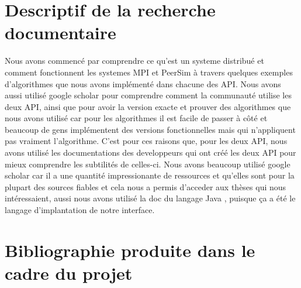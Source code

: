 \documentclass{article}
\begin{document}
		\section{Descriptif de la recherche documentaire}
		\indent Nous avons commencé par comprendre ce qu'est un systeme distribué et comment fonctionnent les systemes MPI et PeerSim à travers quelques exemples d'algorithmes que nous avons implémenté dans chacune des API. 
		\newline
		\indent	
Nous avons aussi utilisé google scholar pour comprendre comment la communauté utilise les deux API, ainsi que pour avoir la version exacte et prouver des algorithmes que nous avons utilisé car pour les algorithmes il est facile de passer à côté et beaucoup de gens implémentent des versions fonctionnelles mais qui n'appliquent pas vraiment l'algorithme.
		\newline
		\indent
 C'est pour ces raisons que, pour les deux API, nous avons utilisé les documentations des developpeurs qui ont créé les deux API pour mieux comprendre les subtilités de celles-ci.
		\newline
		\indent Nous avons beaucoup utilisé google scholar car il a une quantité impressionante de ressources et qu'elles sont pour la plupart des sources fiables et cela nous a permis d'acceder aux thèses qui nous intéressaient, aussi nous avons utilisé la doc du langage Java , puisque ça a été le langage d'implantation de notre interface.

		\newpage
		\section{Bibliographie produite dans le cadre du projet}
\end{document}
